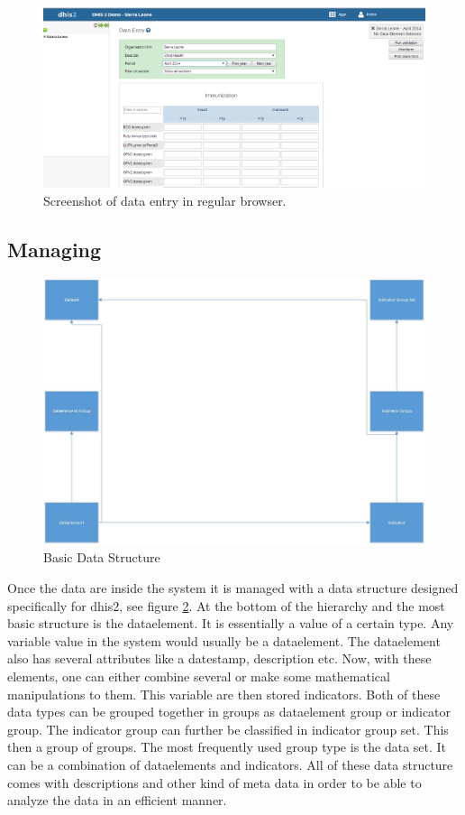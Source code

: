 \begin{figure}
\centering
\includegraphics[width=\columnwidth]{context/img/dhis2DataEntry}
\caption{Screenshot of data entry in regular browser.}
\label{fig:dataentry}
\end{figure}

\subsection{Managing}
\begin{figure}
\centering
\includegraphics[width=\columnwidth]{context/img/dataStructure}
\caption{Basic Data Structure}
\label{fig:structure}
\end{figure}
Once the data are inside the system it is managed with a data structure designed specifically for \gls{dhis2}, see figure \ref{fig:structure}.
At the bottom of the hierarchy and the most basic structure is the dataelement. 
It is essentially a value of a certain type. 
Any variable value in the system would usually be a dataelement. 
The dataelement also has several attributes like a datestamp, description etc. 
Now, with these elements, one can either combine several or make some mathematical manipulations to them. 
This variable are then stored indicators. 
Both of these data types can be grouped together in groups as dataelement group or indicator group. 
The indicator group can further be classified in indicator group set. 
This then a group of groups. 
The most frequently used group type is the data set. 
It can be a combination of dataelements and indicators. 
All of these data structure comes with descriptions and other kind of meta data in order to be able to analyze the data in an efficient manner.


